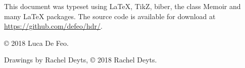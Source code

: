 \begin{titlingpage}
  \bigskip

  This document was typeset using \LaTeX{}, TikZ, biber, the class
  Memoir and many \LaTeX{} packages. The source code is available for
  download at \url{https://github.com/defeo/hdr/}.

  \bigskip

  \copyright{} 2018 Luca De Feo.
  
  \bigskip

  \ifartwork
  Drawings by Rachel Deyts, \copyright{} 2018 Rachel Deyts.
  \bigskip\fi

  \doclicenseThis
\end{titlingpage}
